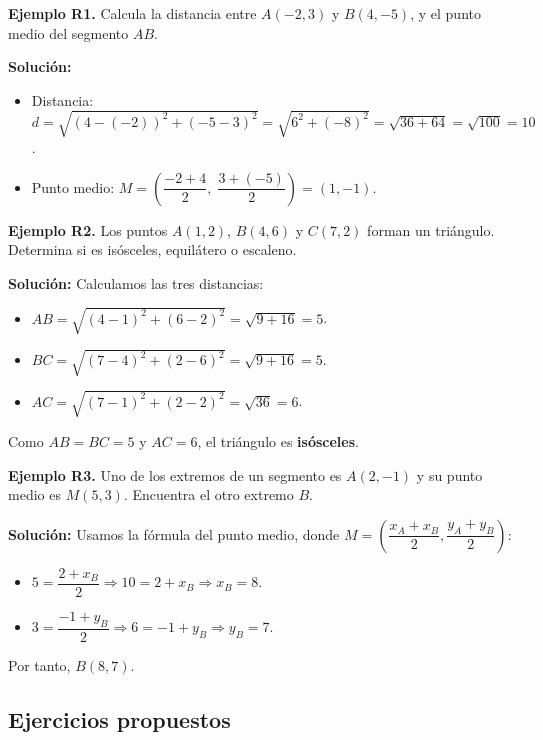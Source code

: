 \documentclass[12pt, letterpaper]{article}
\begin{document}
\textbf{Ejemplo R1.} Calcula la distancia entre $A(-2, 3)$ y $B(4, -5)$, y el punto medio del segmento $AB$.

\begin{cuadrosolucion}
  \textbf{Solución:}
  \begin{itemize}
    \item Distancia: $d = \sqrt{(4 - (-2))^2 + (-5 - 3)^2} = \sqrt{6^2 + (-8)^2} = \sqrt{36 + 64} = \sqrt{100} = 10$.
    \item Punto medio: $M = \left(\dfrac{-2 + 4}{2}, \; \dfrac{3 + (-5)}{2}\right) = (1, -1)$.
  \end{itemize}
\end{cuadrosolucion}

\textbf{Ejemplo R2.} Los puntos $A(1, 2)$, $B(4, 6)$ y $C(7, 2)$ forman un triángulo. Determina si es isósceles, equilátero o escaleno.

\begin{cuadrosolucion}
  \textbf{Solución:} Calculamos las tres distancias:
  \begin{itemize}
    \item $AB = \sqrt{(4-1)^2 + (6-2)^2} = \sqrt{9 + 16} = 5$.
    \item $BC = \sqrt{(7-4)^2 + (2-6)^2} = \sqrt{9 + 16} = 5$.
    \item $AC = \sqrt{(7-1)^2 + (2-2)^2} = \sqrt{36} = 6$.
  \end{itemize}
  Como $AB = BC = 5$ y $AC = 6$, el triángulo es \textbf{isósceles}.
\end{cuadrosolucion}

\textbf{Ejemplo R3.} Uno de los extremos de un segmento es $A(2, -1)$ y su punto medio es $M(5, 3)$. Encuentra el otro extremo $B$.

\begin{cuadrosolucion}
  \textbf{Solución:} Usamos la fórmula del punto medio, donde $M = \left(\dfrac{x_A + x_B}{2}, \dfrac{y_A + y_B}{2}\right)$:
  \begin{itemize}
    \item $5 = \dfrac{2 + x_B}{2} \Rightarrow 10 = 2 + x_B \Rightarrow x_B = 8$.
    \item $3 = \dfrac{-1 + y_B}{2} \Rightarrow 6 = -1 + y_B \Rightarrow y_B = 7$.
  \end{itemize}
  Por tanto, $B(8, 7)$.
\end{cuadrosolucion}

\subsection{Ejercicios propuestos}
\end{document}
